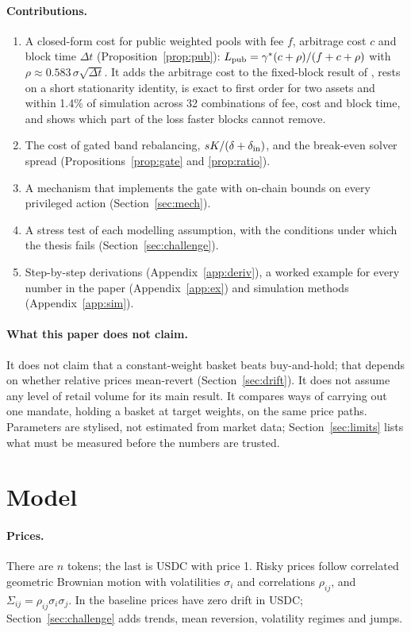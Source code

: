 \paragraph{Contributions.}
\begin{enumerate}
\item A closed-form cost for public weighted pools with fee $f$, arbitrage cost $c$ and block time $\Delta t$ (Proposition~\ref{prop:pub}): $L_{\mathrm{pub}}=\gamma^{*}(c+\rho)/(f+c+\rho)$ with $\rho\approx0.583\,\sigma\sqrt{\Delta t}$. It adds the arbitrage cost to the fixed-block result of \cite{nt}, rests on a short stationarity identity, is exact to first order for two assets and within 1.4\% of simulation across 32 combinations of fee, cost and block time, and shows which part of the loss faster blocks cannot remove.
\item The cost of gated band rebalancing, $sK/(\delta+\delta_{\mathrm{in}})$, and the break-even solver spread (Propositions~\ref{prop:gate} and \ref{prop:ratio}).
\item A mechanism that implements the gate with on-chain bounds on every privileged action (Section~\ref{sec:mech}).
\item A stress test of each modelling assumption, with the conditions under which the thesis fails (Section~\ref{sec:challenge}).
\item Step-by-step derivations (Appendix~\ref{app:deriv}), a worked example for every number in the paper (Appendix~\ref{app:ex}) and simulation methods (Appendix~\ref{app:sim}).
\end{enumerate}

\paragraph{What this paper does not claim.} It does not claim that a constant-weight basket beats buy-and-hold; that depends on whether relative prices mean-revert (Section~\ref{sec:drift}). It does not assume any level of retail volume for its main result. It compares ways of carrying out one mandate, holding a basket at target weights, on the same price paths. Parameters are stylised, not estimated from market data; Section~\ref{sec:limits} lists what must be measured before the numbers are trusted.

\section{Model}
\label{sec:model}

\paragraph{Prices.} There are $n$ tokens; the last is USDC with price 1. Risky prices follow correlated geometric Brownian motion with volatilities $\sigma_i$ and correlations $\rho_{ij}$, and $\Sigma_{ij}=\rho_{ij}\sigma_i\sigma_j$. In the baseline prices have zero drift in USDC; Section~\ref{sec:challenge} adds trends, mean reversion, volatility regimes and jumps.

